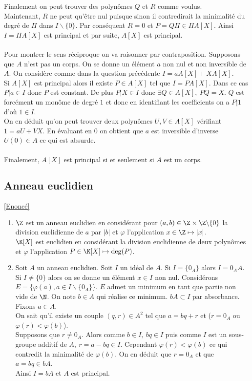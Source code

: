 \documentclass[8pt]{book}
\begin{document}
\begin{enumerate}[leftmargin=*]
		Finalement on peut trouver des polynômes $Q$ et $R$ comme voulus.\\
		Maintenant, $R$ ne peut qu'être nul puisque sinon il contredirait la minimalité du degré de $\Pi$ dans $I\backslash\{0\}$. Par conséquent $R=0$ et $P=Q\Pi\in \Pi A[X]$. Ainsi $I=\Pi A[X]$ est principal et par suite, $A[X]$ est principal.\\\\
		Pour montrer le sens réciproque on va raisonner par contraposition. Supposons que $A$ n'est pas un corps. On se donne un élément $a$ non nul et non inversible de $A$. On considère comme dans la question précédente $I=aA[X]+XA[X]$.\\
		Si $A[X]$ est principal alors il existe $P\in A[X]$ tel que $I=PA[X]$. Dans ce cas $P|a\in I$ donc $P$ est constant. De plus $P|X\in I$ donc $\exists Q\in A[X],\ PQ=X$. $Q$ est forcément un monôme de degré $1$ et donc en identifiant les coefficients on a $P|1$ d'où $1\in I$.\\
		On en déduit qu'on peut trouver deux polynômes $U,V\in A[X]$ vérifiant $1=aU+VX$. En évaluant en $0$ on obtient que $a$ est inversible d'inverse $U(0)\in A$ ce qui est absurde.\\\\
		Finalement, $A[X]$ est principal si et seulement si $A$ est un corps.
	\end{enumerate}
	
	\subsection{Anneau euclidien }
	\textcolor{blue}{\hyperref[Anneau euclidien]{[Enoncé]}}\\
	\label{Anneau euclidien corrigé}
	\begin{enumerate}[leftmargin=*]
		\item $\Z$ est un anneau euclidien en considérant pour $(a,b)\in \Z\times\Z\backslash\{0\}$ la division euclidienne de $a$ par $|b|$ et $\varphi$ l'application $x\in \Z\mapsto |x|$.\\
		$\K[X]$ est euclidien en considérant la division euclidienne de deux polynômes et $\varphi$ l'application $P\in \K[X]\mapsto \deg(P)$.
		\item Soit $A$ un anneau euclidien. Soit $I$ un idéal de $A$. Si $I=\{0_A\}$ alors $I=0_AA$. Si $I\ne \{0\}$ alors on se donne un élément $x\in I$ non nul. Considérons $E=\{\varphi(a),a\in I\backslash\{0_A\}\}$. $E$ admet un minimum en tant que partie non vide de $\N$. On note $b\in A$ qui réalise ce minimum. $bA\subset I$ par absorbance. Fixons $a\in A$.\\
		On sait qu'il existe un couple $(q,r)\in A^2$ tel que $a=bq+r$ et ($r=0_A$ ou $\varphi(r)<\varphi(b)$).\\
		Supposons que $r\ne 0_A$. Alors comme $b\in I,\ bq\in I$ puis comme $I$ est un sous-groupe additif de $A,\ r=a-bq\in I$. Cependant $\varphi(r)<\varphi(b)$ ce qui contredit la minimalité de $\varphi(b)$. On en déduit que $r=0_A$ et que $a=bq\in bA$.\\
		Ainsi $I=bA$ et $A$ est principal.
	\end{enumerate}
	
\end{document}
